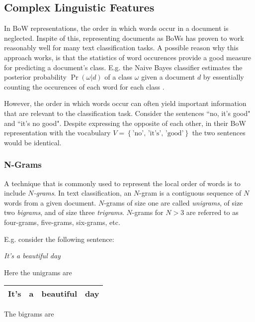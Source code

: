  \subsection{Complex Linguistic Features}
 \label{sec:statistics}
In BoW representations, the order in which words occur in a document is
neglected. Inspite of this, representing documents as BoWs has proven
to work reasonably well for many text classification tasks. A possible reason why this approach works, is
that the statistics of word occurences provide a good measure for predicting a
document's class. E.g. the Naive Bayes classifier estimates the posterior
probability $\Pr(\omega|d)$ of a class $\omega$ given a document $d$ by
essentially counting the occurences of each word for each class
\cite{mccallum1998comparison}.

However, the order in which words occur can often yield important information
that are relevant to the classification task. Consider the sentences ``no,
it's good" and ``it's no good". Despite expressing the opposite of each other,
in their BoW representation with the vocabulary $V = \left\{\text{'no', 'it's', 'good'} \right\}$ 
the two sentences would be identical. 

\subsubsection{N-Grams}
\label{sssec:n-grams}
A technique that is commonly used to represent the local order
of words is to include \emph{$N$-grams}. In text classification, an $N$-gram is
a contiguous sequence of $N$ words from a given document. $N$-grams of size one are called
\emph{unigrams}, of size two \emph{bigrams}, and of size three \emph{trigrams}.
$N$-grams for $N > 3$ are referred to as four-grams, five-grams, six-grams, etc. 

E.g. consider the following sentence:

\begin{center} 
\textit{It's a beautiful day}
\end{center} 

Here the unigrams are

\begin{center}
\begin{tabular}{|c|c|c|c|}
\hline 
It's & a & beautiful & day \\
\hline
\end{tabular}
\end{center}

The bigrams are 

